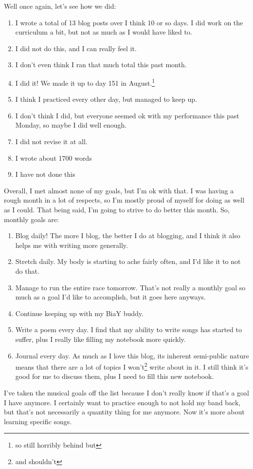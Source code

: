 \documentclass[12pt]{article}[titlepage]
\renewcommand{\,}{\textsuperscript{,}}
\begin{document}
Well once again, let's see how we did:
\begin{enumerate}
\item I wrote a total of 13 blog posts over I think 10 or so days. I did work on the curriculum a bit, but not as much as I would have liked to.
\item I did not do this, and I can really feel it.
\item I don't even think I ran that much total this past month.
\item I did it! We made it up to day 151 in August.\footnote{so still horribly behind but}
\item I think I practiced every other day, but managed to keep up.
\item I don't think I did, but everyone seemed ok with my performance this past Monday, so maybe I did well enough.
\item I did not revise it at all.
\item I wrote about 1700 words
\item I have not done this
\end{enumerate}

Overall, I met almost none of my goals, but I'm ok with that.
I was having a rough month in a lot of respects, so I'm mostly proud of myself for doing as well as I could.
That being said, I'm going to strive to do better this month.
So, monthly goals are:

\begin{enumerate}
\item Blog daily! The more I blog, the better I do at blogging, and I think it also helps me with writing more generally.
\item Stretch daily. My body is starting to ache fairly often, and I'd like it to not do that.
\item Manage to run the entire race tomorrow. That's not really a monthly goal so much as a goal I'd like to accomplish, but it goes here anyways.
\item Continue keeping up with my BiaY buddy.
\item Write a poem every day. I find that my ability to write songs has started to suffer, plus I really like filling my notebook more quickly.
\item Journal every day. As much as I love this blog, its inherent semi-public nature means that there are a lot of topics I won't\footnote{and shouldn't} write about in it. I still think it's good for me to discuss them, plus I need to fill this new notebook.
\end{enumerate}

I've taken the musical goals off the list because I don't really know if that's a goal I have anymore.
I certainly want to practice enough to not hold my band back, but that's not necessarily a quantity thing for me anymore.
Now it's more about learning specific songs.
\end{document}
